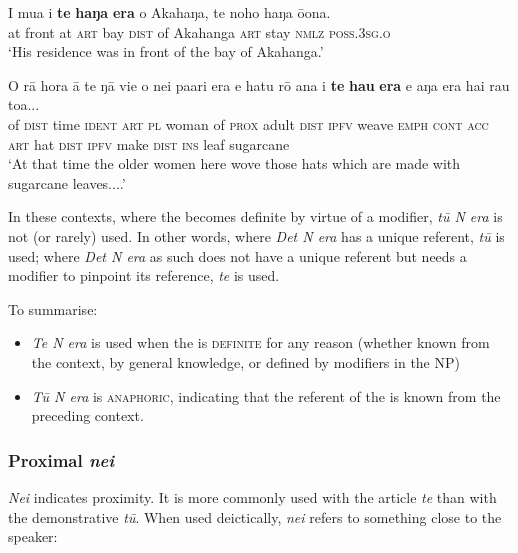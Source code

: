 \ea\label{ex:4.204}
\gll {\ꞌ}I mu{\ꞌ}a i \textbf{te} \textbf{haŋa} \textbf{era} o {\ꞌ}Akahaŋa, te noho haŋa ō{\ꞌ}ona. \\
at front at \textsc{art} bay \textsc{dist} of Akahanga \textsc{art} stay \textsc{nmlz} \textsc{poss.3sg.o} \\

\glt 
‘His residence was in front of the bay of Akahanga.’ \textstyleExampleref{[Blx-2-3.002]}
\z

\ea\label{ex:4.205}
\gll O rā hora {\ꞌ}ā te ŋā vi{\ꞌ}e o nei pa{\ꞌ}ari era e hatu rō {\ꞌ}ana  i \textbf{te} \textbf{ha{\ꞌ}u} \textbf{era} e aŋa era hai rau toa...\\
of \textsc{dist} time \textsc{ident} \textsc{art} \textsc{pl} woman of \textsc{prox} adult \textsc{dist} \textsc{ipfv} weave \textsc{emph} \textsc{cont}  \textsc{acc} \textsc{art} hat \textsc{dist} \textsc{ipfv} make \textsc{dist} \textsc{ins} leaf sugarcane\\

\glt
‘At that time the older women here wove those hats which are made with sugarcane leaves....’ \textstyleExampleref{[R106.049]} 
\z

In these contexts, where the  becomes definite by virtue of a modifier, \textit{tū N era} is not (or rarely) used. In other words, where \textit{Det N era} has a unique referent, \textit{tū} is used; where \textit{Det N era} as such does not have a unique referent but needs a modifier to pinpoint its reference, \textit{te} is used.

To summarise: 

\begin{itemize}
\item 
\textit{Te N era} is used when the  is \textsc{definite} for any reason (whether known from the context, by general knowledge, or defined by modifiers in the NP)

\item 
\textit{Tū N era} is \textsc{anaphoric}, indicating that the referent of the  is known from the preceding context.

\end{itemize}
\subsubsection{Proximal \textit{nei}}\label{sec:4.6.3.2}
\textit{Nei} indicates proximity. It is more commonly used with the article \textit{te} than with the demonstrative \textit{tū}. When used deictically, \textit{nei} refers to something close to the speaker:


